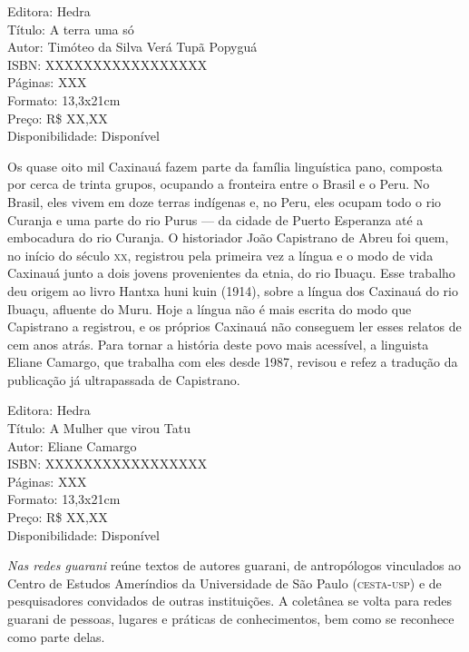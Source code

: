 \begin{ficha}
Editora: Hedra\\
Título: A terra uma só\\
Autor:  Timóteo da Silva Verá Tupã Popyguá\\ 
ISBN: XXXXXXXXXXXXXXXXX\\
Páginas: XXX\\
Formato: 13,3x21cm\\
Preço: R\$ XX,XX\\
Disponibilidade: Disponível
\end{ficha}

\pagebreak


\noindent{}Os quase oito mil Caxinauá fazem parte da família linguística pano, composta por cerca de trinta grupos, ocupando a fronteira entre o Brasil e o Peru. No Brasil, eles vivem em doze terras indígenas e, no Peru, eles ocupam todo o rio Curanja e uma parte do rio Purus — da cidade de Puerto Esperanza até a embocadura do rio Curanja. O historiador João Capistrano de Abreu foi quem, no início do século \textsc{xx}, registrou pela primeira vez a língua e o modo de vida Caxinauá junto a dois jovens provenientes da etnia, do rio Ibuaçu. Esse trabalho deu origem ao livro Hantxa huni kuin (1914), sobre a língua dos Caxinauá do rio Ibuaçu, afluente do Muru. Hoje a língua não é mais escrita do modo que Capistrano a registrou, e os próprios Caxinauá não conseguem ler esses relatos de cem anos atrás. Para tornar a história deste povo mais acessível, a linguista Eliane Camargo, que trabalha com eles desde 1987, revisou e refez a tradução da publicação já ultrapassada de Capistrano.

\begin{ficha}
Editora: Hedra\\
Título: A Mulher que virou Tatu\\
Autor:  Eliane Camargo\\ 
ISBN: XXXXXXXXXXXXXXXXX\\
Páginas: XXX\\
Formato: 13,3x21cm\\
Preço: R\$ XX,XX\\
Disponibilidade: Disponível
\end{ficha}

\pagebreak


\noindent{}\textit{Nas redes guarani} reúne textos de autores guarani, de antropólogos vinculados ao Centro de Estudos Ameríndios da Universidade de São Paulo (\textsc{cesta-usp}) e de pesquisadores convidados de outras instituições. A coletânea se volta para redes guarani de pessoas, lugares e práticas de conhecimentos, bem como se reconhece como parte delas.

